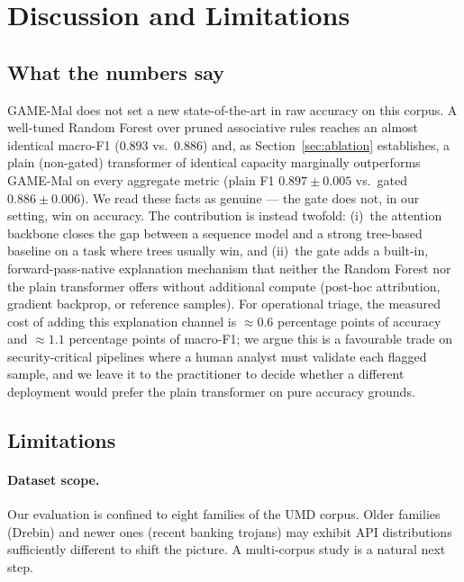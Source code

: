 \section{Discussion and Limitations}
\label{sec:discussion}

\subsection{What the numbers say}

GAME-Mal does not set a new state-of-the-art in raw accuracy on
this corpus. A well-tuned Random Forest over pruned associative
rules reaches an almost identical macro-F1 ($0.893$ vs.\ $0.886$)
and, as Section~\ref{sec:ablation} establishes, a plain
(non-gated) transformer of identical capacity marginally
outperforms GAME-Mal on every aggregate metric (plain F1
$0.897 \pm 0.005$ vs.\ gated $0.886 \pm 0.006$). We read these
facts as genuine --- the gate does not, in our setting, win on
accuracy. The contribution is instead twofold: (i)~the attention
backbone closes the gap between a sequence model and a strong
tree-based baseline on a task where trees usually win, and
(ii)~the gate adds a built-in, forward-pass-native explanation
mechanism that neither the Random Forest nor the plain
transformer offers without additional compute (post-hoc
attribution, gradient backprop, or reference samples). For
operational triage, the measured cost of adding this
explanation channel is $\approx 0.6$ percentage points of
accuracy and $\approx 1.1$ percentage points of macro-F1; we
argue this is a favourable trade on security-critical pipelines
where a human analyst must validate each flagged sample, and we
leave it to the practitioner to decide whether a different
deployment would prefer the plain transformer on pure accuracy
grounds.

\subsection{Limitations}

\paragraph{Dataset scope.} Our evaluation is confined to eight
families of the UMD corpus. Older families (Drebin) and newer
ones (recent banking trojans) may exhibit API distributions
sufficiently different to shift the picture. A multi-corpus study
is a natural next step.

